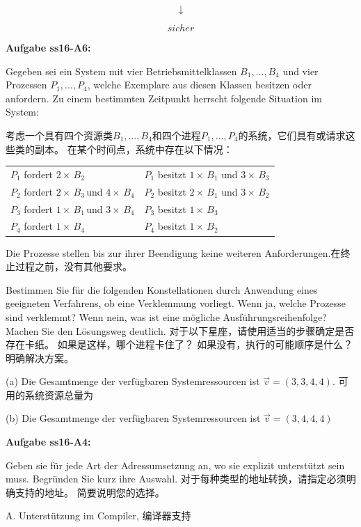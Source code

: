 \documentclass[fleqn]{article}
\begin{document}
$$\downarrow$$

$$sicher$$

\noindent\textbf{Aufgabe ss16-A6:}

Gegeben sei ein System mit vier Betriebsmittelklassen 
$B_1, \dots, B_4$ und vier Prozessen $P_1, \dots, P_4$, 
welche Exemplare aus diesen Klassen besitzen oder anfordern. Zu einem bestimmten Zeitpunkt herrscht folgende Situation im System:

考虑一个具有四个资源类$ B_1,\dots,B_4 $和四个进程$ P_1,\dots,P_4 $的系统，它们具有或请求这些类的副本。 
在某个时间点，系统中存在以下情况：

\begin{center}
    \begin{tabular}{l||l}
        $P_1$ fordert $2\times\,B_2$&$P_1$ besitzt $1\times\,B_1$ und $3\times\,B_3$\\
        $P_2$ fordert $2\times\,B_3\,$und $ 4\times\,B_4$&$P_2$ besitzt $2\times\,B_1$ und $3\times\,B_2$\\
        $P_3$ fordert $1\times\,B_1\,$und $ 3\times\,B_4$&$P_3$ besitzt $1\times\,B_3$\\
        $P_4$ fordert $1\times\,B_4$&$P_4$ besitzt $1\times\,B_2$
    \end{tabular}
\end{center}

Die Prozesse stellen bis zur ihrer Beendigung keine weiteren Anforderungen.在终止过程之前，没有其他要求。

Bestimmen Sie für die folgenden Konstellationen durch Anwendung eines geeigneten Verfahrens, ob eine Verklemmung vorliegt. Wenn ja, welche Prozesse sind verklemmt? Wenn nein, was ist eine mögliche Ausführungsreihenfolge? Machen Sie den Lösungsweg deutlich.
对于以下星座，请使用适当的步骤确定是否存在卡纸。 如果是这样，哪个进程卡住了？ 如果没有，执行的可能顺序是什么？ 明确解决方案。

(a) Die Gesamtmenge der verfügbaren Systemressourcen ist $\vec{v}=(3,3,4,4)$. 可用的系统资源总量为

(b) Die Gesamtmenge der verfügbaren Systemressourcen ist $\vec{v}=(3,4,4,4)$

\noindent\textbf{Aufgabe ss16-A4:}

Geben sie für jede Art der Adressumsetzung an, wo sie explizit unterstützt sein muss.
Begründen Sie kurz ihre Auswahl.
对于每种类型的地址转换，请指定必须明确支持的地址。
简要说明您的选择。

A. Unterstützung im Compiler, 编译器支持
\end{document}

